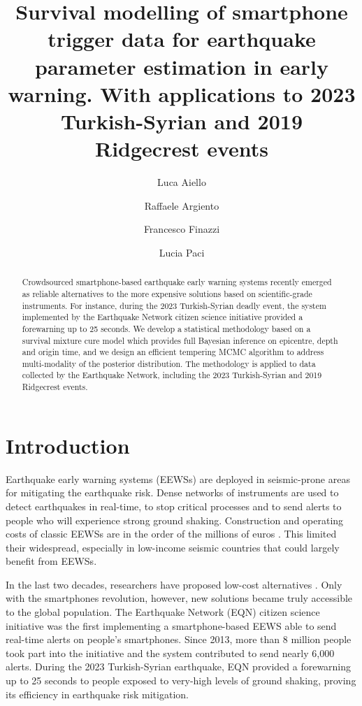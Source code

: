 \documentclass[final]{statsoc}
\title[Survival modelling in earthquake early warning]{Survival modelling of smartphone trigger data for earthquake parameter estimation in early warning. With applications to 2023 Turkish-Syrian and 2019 Ridgecrest events}
\author{Luca Aiello}
\author{Raffaele Argiento}
\author{Francesco Finazzi}
\author[Aiello, Argiento, Finazzi and Paci]{Lucia Paci}
\begin{document}
\begin{abstract}
    Crowdsourced smartphone-based earthquake early warning systems recently emerged as reliable 
    alternatives to the more expensive solutions based on scientific-grade instruments.
    For instance, during the 2023 Turkish-Syrian deadly
    event, the system implemented by the Earthquake Network citizen science initiative provided a forewarning up to 25 seconds. %
    We develop a statistical methodology based on a survival mixture cure model which provides full Bayesian inference on epicentre, depth and origin time, and we design an efficient tempering MCMC algorithm to address multi-modality of the posterior distribution. 
    The methodology is applied to data collected by the Earthquake Network, including  the 2023 Turkish-Syrian and 2019 Ridgecrest events.
\end{abstract}


\section{Introduction}\label{sec:introduction}

Earthquake early warning systems (EEWSs) \citep{gasparini2007earthquake} are deployed in seismic-prone areas for mitigating the earthquake risk. Dense networks of instruments are used to detect earthquakes in real-time, to stop critical processes and to send alerts to people who will experience strong ground shaking. Construction and operating costs of classic EEWSs are in the order of the millions of euros \citep{given2014technical}. This limited their widespread, especially in low-income seismic countries that could largely benefit from EEWSs.

In the last two decades, researchers have proposed low-cost alternatives \citep{cochran2009quake, clayton2011community}. Only with the smartphones revolution, however, new solutions \citep{finazzi2016earthquake, kong2016myshake} became truly accessible to the global population. The Earthquake Network (EQN) citizen science initiative \citep{finazzi2020earthquake} was the first implementing a smartphone-based EEWS able to send real-time alerts on people's smartphones. Since 2013, more than 8 million people took part into the initiative and the system contributed to send nearly 6,000 alerts. During the 2023 Turkish-Syrian earthquake, EQN provided a forewarning up to 25 seconds to people exposed to very-high levels of ground shaking, proving its efficiency in earthquake risk mitigation.
\end{document}
